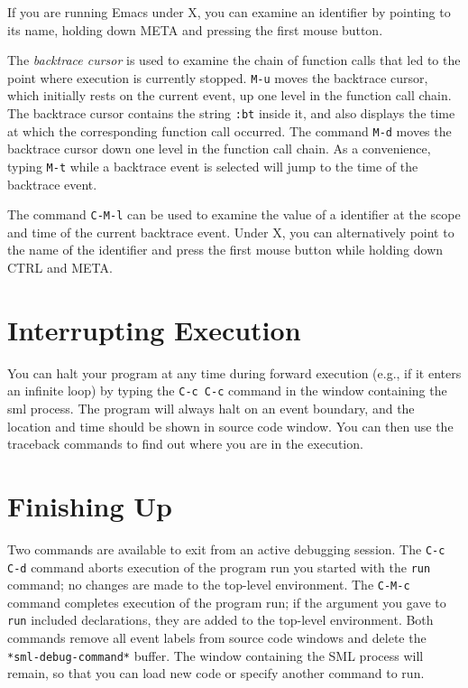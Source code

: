 If you are running Emacs under X, you can examine an identifier by
pointing to its name, holding down META and pressing the first mouse button.

The {\em backtrace cursor} is used to examine the chain of function
calls that led to the point where execution is currently stopped.
\verb'M-u' moves the backtrace cursor, which initially rests on the current
event, up one level in the function call chain.  The
backtrace cursor contains the string \verb':bt' inside it, and also
displays the time at which the corresponding function call occurred.
The command \verb'M-d' moves the backtrace cursor down one level in
the function call chain.  As a convenience, typing \verb'M-t' while a
backtrace event is selected will jump to the time of the backtrace event.

The command \verb'C-M-l' can be used to examine the value of a
identifier at the scope and time of the current backtrace event.  Under
X, you can alternatively point to the name of the identifier and press
the first mouse button while holding down CTRL and META.

\section{Interrupting Execution}
You can halt your program at any time during forward execution 
(e.g., if it enters an infinite loop)
by typing the \verb'C-c C-c' command in the window containing the sml process.
The program will always halt on an event boundary, and the location and time
should be shown in source code window.  You can then use the traceback 
commands to find out where you are in the execution.

\section{Finishing Up}
Two commands are available to exit from an active debugging session. The
\verb'C-c C-d' command aborts execution of the program run you
started with the \verb'run' command; no changes are made to the top-level
environment. The \verb'C-M-c' command completes 
execution of the program run; if the argument you gave to \verb'run' 
included declarations, they are added to the top-level environment.
Both commands remove all event labels from source code windows and delete
the \verb'*sml-debug-command*' buffer.  The window containing the SML
process will remain, so that you can load new code or specify another
command to run.  

